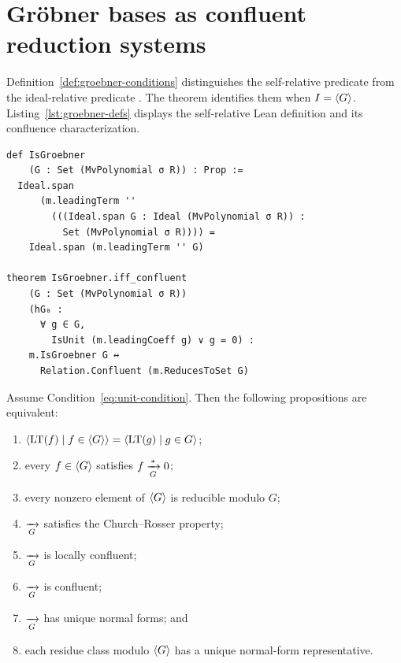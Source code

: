 \section{Gr\"obner bases as confluent reduction systems}\label{sec:groebner-criterion}

Definition~\ref{def:groebner-conditions} distinguishes the self-relative
predicate
from the ideal-relative predicate
.
The theorem
identifies them when
$I=\langle G \rangle$.  Listing~\ref{lst:groebner-defs} displays the self-relative
Lean definition and its confluence characterization.

\begin{lstlisting}[style=lean,caption={The self-relative Gr\"obner condition and its confluence characterization.},label={lst:groebner-defs}]
def IsGroebner
    (G : Set (MvPolynomial σ R)) : Prop :=
  Ideal.span
      (m.leadingTerm ''
        (((Ideal.span G : Ideal (MvPolynomial σ R)) :
          Set (MvPolynomial σ R)))) =
    Ideal.span (m.leadingTerm '' G)

theorem IsGroebner.iff_confluent
    (G : Set (MvPolynomial σ R))
    (hG₀ :
      ∀ g ∈ G,
        IsUnit (m.leadingCoeff g) ∨ g = 0) :
    m.IsGroebner G ↔
      Relation.Confluent (m.ReducesToSet G)
\end{lstlisting}

\begin{theorem}
\label{thm:groebner-characterizations}
Assume Condition~\eqref{eq:unit-condition}.  Then the following propositions
are equivalent:
\begin{enumerate}[label=(\alph*),leftmargin=2em]
  \item $\langle \operatorname{LT}(f)\mid f\in\langle G \rangle \rangle
        =\langle \operatorname{LT}(g)\mid g\in G \rangle$;
  \item every $f\in\langle G \rangle$ satisfies $f\xrightarrow[G]{*}0$;
  \item every nonzero element of $\langle G \rangle$ is reducible modulo $G$;
  \item $\xrightarrow[G]{}$ satisfies the Church--Rosser property;
  \item $\xrightarrow[G]{}$ is locally confluent;
  \item $\xrightarrow[G]{}$ is confluent;
  \item $\xrightarrow[G]{}$ has unique normal forms; and
  \item each residue class modulo $\langle G \rangle$ has a unique normal-form
        representative.
\end{enumerate}
\end{theorem}

